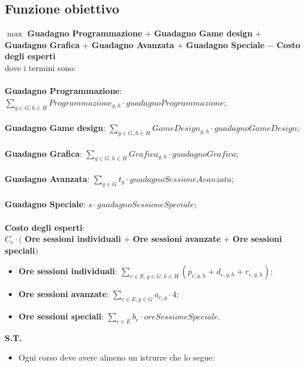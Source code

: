 \documentclass[12pt]{article}
\begin{document}
   \subsection{Funzione obiettivo}
    $\max$ \textbf{Guadagno Programmazione} $+$ \textbf{Guadagno Game design} $+$ \textbf{Guadagno Grafica} $+$      \textbf{Guadagno Avanzata} $+$ \textbf{Guadagno Speciale} $-$ \textbf{Costo degli esperti}\\
    \newline
   dove i termini sono:\\ \\
    \textbf{Guadagno Programmazione}: $\sum_{g \in G, h \in H} Programmazione_{g,h} \cdot guadagnoProgrammazione$;\\ \\
    \textbf{Guadagno Game design}: $\sum_{g \in G, h \in H} GameDesign_{g,h} \cdot guadagnoGameDesign$;\\ \\
    \textbf{Guadagno Grafica}: $\sum_{g \in G, h \in H} Grafica_{g,h} \cdot guadagnoGrafica$;\\ \\
    \textbf{Guadagno Avanzata}: $\sum_{g \in G} t_g \cdot guadagnoSessioneAvanzata$;\\ \\
    \textbf{Guadagno Speciale}: $s \cdot guadagnoSessioneSpeciale$;\\ \\
    \textbf{Costo degli esperti}:\\ $C_e \cdot ($ \textbf{Ore sessioni individuali} $+$ \textbf{Ore sessioni avanzate} $+$ \textbf{Ore sessioni speciali}$)$
    \begin{itemize}
        \item \textbf{Ore sessioni individuali}: $\sum_{e \in E, g \in G, h \in H} (p_{e,g,h} + d_{e,g,h} + r_{e,g,h})$;
        \item \textbf{Ore sessioni avanzate}: $\sum_{e \in E, g \in G} a_{e,g} \cdot 4$;
        \item \textbf{Ore sessioni speciali}: $\sum_{e \in E} b_{e} \cdot oreSessioneSpeciale$.
    \end{itemize}
    \newpage
    \textbf{S.T.}\\
    \begin{itemize}
        \item Ogni corso deve avere almeno un istrurre che lo segue:
    \end{itemize}
\end{document}
